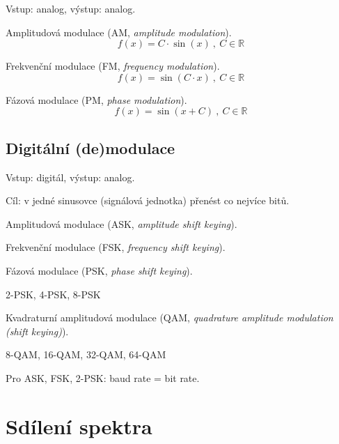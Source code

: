 \begin{compactitem}
    \item Vstup: analog, výstup: analog.
    \item Amplitudová modulace (AM, \textit{amplitude modulation}).
    $$ f(x) = C \cdot \sin{(x)} ~,~ C \in \mathbb{R} $$
    \item Frekvenční modulace (FM, \textit{frequency modulation}).
    $$ f(x) = \sin{(C \cdot x)} ~,~ C \in \mathbb{R} $$
    \item Fázová modulace (PM, \textit{phase modulation}).
    $$ f(x) = \sin{(x + C)} ~,~ C \in \mathbb{R} $$
\end{compactitem}

\subsection{Digitální (de)modulace}

\begin{compactitem}
    \item Vstup: digitál, výstup: analog.
    \item Cíl: v jedné sinusovce (signálová jednotka) přenést co nejvíce bitů.
    \item Amplitudová modulace (ASK, \textit{amplitude shift keying}).
    \item Frekvenční modulace (FSK, \textit{frequency shift keying}).
    \item Fázová modulace (PSK, \textit{phase shift keying}). \begin{compactitem}
        \item 2-PSK, 4-PSK, 8-PSK
    \end{compactitem}
    \item Kvadraturní amplitudová modulace (QAM, \textit{quadrature amplitude modulation (shift keying)}). \begin{compactitem}
        \item 8-QAM, 16-QAM, 32-QAM, 64-QAM
    \end{compactitem}
    \item Pro ASK, FSK, 2-PSK: baud rate = bit rate.
\end{compactitem}


\section{Sdílení spektra}

